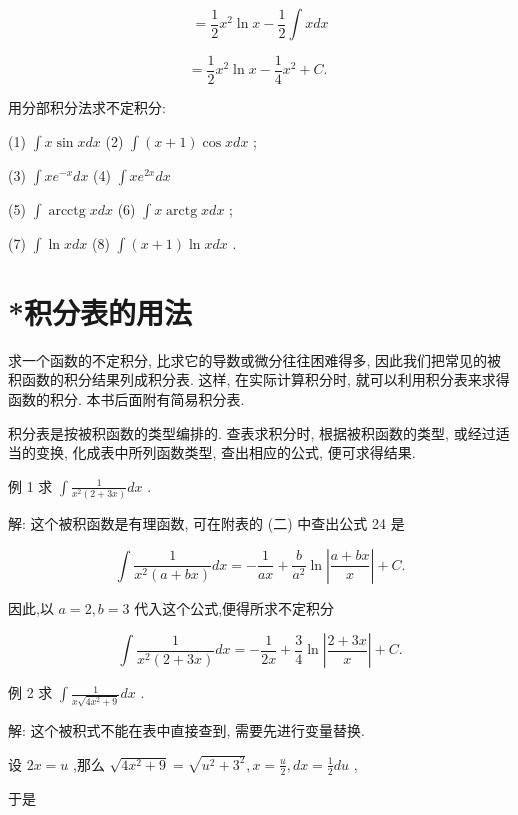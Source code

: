\documentclass[lang=cn,newtx,12pt,scheme=chinese]{elegantbook}
\begin{document}
\[
= \frac{1}{2}{x}^{2}\ln x - \frac{1}{2}\int {xdx}
\]

\[
= \frac{1}{2}{x}^{2}\ln x - \frac{1}{4}{x}^{2} + C\text{. }
\]

\begin{problemset}[练习]

\item 用分部积分法求不定积分:

(1) \(\int x\sin {xdx}\) (2) \(\int \left( {x + 1}\right) \cos {xdx}\) ;

(3) \(\int x{e}^{-x}{dx}\) (4) \(\int x{e}^{2x}{dx}\)

(5) \(\int \operatorname{arcctg}{xdx}\) (6) \(\int x\operatorname{arctg}{xdx}\) ;

(7) \(\int \ln {xdx}\) (8) \(\int \left( {x + 1}\right) \ln {xdx}\) .

\end{problemset}

\section*{*积分表的用法}

求一个函数的不定积分, 比求它的导数或微分往往困难得多, 因此我们把常见的被积函数的积分结果列成积分表. 这样, 在实际计算积分时, 就可以利用积分表来求得函数的积分. 本书后面附有简易积分表.

积分表是按被积函数的类型编排的. 查表求积分时, 根据被积函数的类型, 或经过适当的变换, 化成表中所列函数类型, 查出相应的公式, 便可求得结果.

例 1 求 \(\int \frac{1}{{x}^{2}\left( {2 + {3x}}\right) }{dx}\) .

解: 这个被积函数是有理函数, 可在附表的 (二) 中查出公式 24 是

\[
\int \frac{1}{{x}^{2}\left( {a + {bx}}\right) }{dx} = - \frac{1}{ax} + \frac{b}{{a}^{2}}\ln \left| \frac{a + {bx}}{x}\right| + C.
\]

因此,以 \(a = 2,b = 3\) 代入这个公式,便得所求不定积分

\[
\int \frac{1}{{x}^{2}\left( {2 + {3x}}\right) }{dx} = - \frac{1}{2x} + \frac{3}{4}\ln \left| \frac{2 + {3x}}{x}\right| + C.
\]

例 2 求 \(\int \frac{1}{x\sqrt{4{x}^{2} + 9}}{dx}\) .

解: 这个被积式不能在表中直接查到, 需要先进行变量替换.

设 \({2x} = u\) ,那么 \(\sqrt{4{x}^{2} + 9} = \sqrt{{u}^{2} + {3}^{2}},x = \frac{u}{2},{dx} = \frac{1}{2}{du}\) ,

于是
\end{document}
